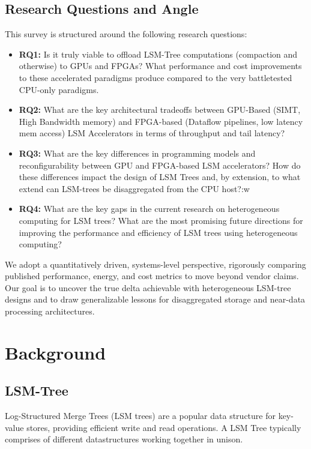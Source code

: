 \documentclass[sigconf]{acmart}
\begin{document}
  \subsection{Research Questions and Angle}
  This survey is structured around the following research questions:

    \begin{itemize}
      \item \textbf{RQ1:} Is it truly viable to offload LSM-Tree computations (compaction and otherwise) to GPUs and FPGAs? What performance and cost improvements to these accelerated paradigms produce compared to the very battletested CPU-only paradigms.
      \item \textbf{RQ2: } What are the key architectural tradeoffs between GPU-Based (SIMT, High Bandwidth memory) and FPGA-based (Dataflow pipelines, low latency mem access) LSM Accelerators in terms of throughput and tail latency?
      \item \textbf{RQ3:} What are the key differences in programming models and reconfigurability between GPU and FPGA-based LSM accelerators? How do these differences impact the design of LSM Trees and, by extension, to what extend can LSM-trees be disaggregated from the CPU host?:w
      \item \textbf{RQ4:} What are the key gaps in the current research on heterogeneous computing for LSM trees? What are the most promising future directions for improving the performance and efficiency of LSM trees using heterogeneous computing?
    \end{itemize}

    We adopt a quantitatively driven, systems-level perspective, rigorously comparing published performance, energy, and cost metrics to move beyond vendor claims. Our goal is to uncover the true delta achievable with heterogeneous LSM-tree designs and to draw generalizable lessons for disaggregated storage and near-data processing architectures.


\section{Background}

  \subsection{LSM-Tree}
    Log-Structured Merge Trees (LSM trees) are a popular data structure for key-value stores, providing efficient write and read operations.
    A LSM Tree typically comprises of different datastructures working together in unison.
\end{document}
